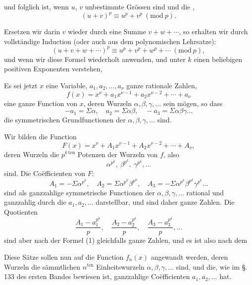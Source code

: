 
und folglich ist, wenn $u$, $v$ unbestimmte Grössen sind und die
,
\[
(u+v)^p \equiv u^p+v^p \ (\mathrm{mod}\ p).
\]

Ersetzen wir darin $v$ wieder durch eine Summe $v+w+\cdots$,
so erhalten wir durch vollständige Induction (oder auch aus
dem polynomischen Lehrsatze):
\[
(u+v+w+\cdots)^p \equiv u^p+v^p+w^p+\cdots \ (\mathrm{mod}\ p),
\]
und wenn wir diese Formel wiederholt anwenden, und unter $k$
einen beliebigen positiven Exponenten verstehen,

Es sei jetzt $x$ eine Variable, $a_1, a_2, \dots, a_\nu$ ganze rationale
Zahlen,
\[
f(x) = x^\nu + a_1 x^{\nu-1} + a_2 x^{\nu-2} + \cdots + a_\nu
\]
eine ganze Function von $x$, deren Wurzeln $\alpha, \beta, \gamma, \dots$ sein
mögen, so dass
\[
-a_1 = \Sigma\alpha, \quad a_2 = \Sigma\alpha\beta, \quad -a_3 = \Sigma\alpha\beta\gamma \dots
\]
die symmetrischen Grundfunctionen der $\alpha, \beta, \gamma, \dots$ sind.

Wir bilden die Function
\[
F(x) = x^\nu + A_1 x^{\nu-1} + A_2 x^{\nu-2} + \cdots + A_\nu,
\]
deren Wurzeln die $p^{k\,\mathrm{ten}}$ Potenzen der Wurzeln von $f$, also
\[
\alpha^{p^k}, \ \beta^{p^k}, \ \gamma^{p^k}, \dots
\]
sind. Die Coëfficienten von $F$:
\[
A_1 = -\Sigma\alpha^{p^k}, \quad A_2 = \Sigma\alpha^{p^k}\beta^{p^k}, \quad A_3 = -\Sigma\alpha^{p^k}\beta^{p^k}\gamma^{p^k} \dots
\]
sind als ganzzahlige symmetrische Functionen der $\alpha, \beta, \gamma, \dots$
rational und ganzzahlig durch die $a_1, a_2, \dots$ darstellbar, und sind
daher ganze Zahlen. Die Quotienten
\[
\frac{A_1 - a_1^{p^k}}{p}, \quad \frac{A_2 - a_2^{p^k}}{p}, \quad \frac{A_3 - a_3^{p^k}}{p}, \dots
\]
sind aber nach der Formel (1) gleichfalls ganze Zahlen, und es
ist also nach dem 

Diese Sätze sollen nun auf die Function $f_n(x)$ angewandt
werden, deren Wurzeln die sämmtlichen  $n^{\mathrm{ten}}$ Einheitswurzeln $\alpha, \beta, \gamma, \dots$ sind, und die, wie im \S.\,133 des ersten
Bandes bewiesen ist, ganzzahlige Coëfficienten $a_1, a_2, \dots$ hat.

